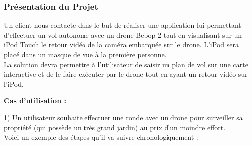 \documentclass{article}
\begin{document}
\subsubsection{Présentation du Projet}
		Un client nous contacte dans le but de réaliser une application lui permettant d'effectuer un vol autonome avec un drone Bebop 2 tout en visualisant sur un iPod Touch le retour vidéo de la caméra embarquée sur le drone. L'iPod sera placé dans un masque de vue à la première personne. \\	
		La solution devra permettre à l'utilisateur de saisir un plan de vol sur une carte interactive et de le faire exécuter par le drone tout en ayant un retour vidéo sur l'iPod.\\
		\medbreak
        \begin{flushleft}
	    \textbf{Cas d'utilisation :} \\
	    \end{flushleft}
	    1) Un utilisateur souhaite effectuer une ronde avec un drone pour surveiller sa propriété (qui possède un très grand jardin) au prix d'un moindre effort.\\
	    Voici un exemple des étapes qu'il va suivre chronologiquement :\\
		[1cm]	     
\end{document}
